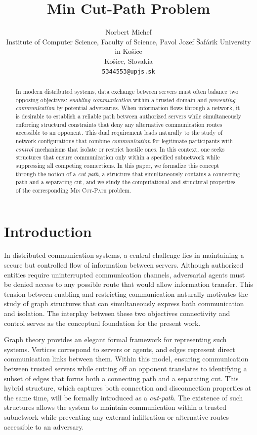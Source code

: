\documentclass[journal ]{new-aiaa}
\title{Min Cut-Path Problem}
\author{Norbert Micheľ\\
Institute of Computer Science, Faculty of Science, Pavol Jozef Šafárik University in Košice\\
Košice, Slovakia\\
\texttt{5344553@upjs.sk}}
\numberwithin{equation}{section}
\theoremstyle{definition}
\theoremstyle{plain}
\theoremstyle{remark}
\begin{document}
\maketitle

\begin{abstract}

In modern distributed systems, data exchange between servers must often balance two opposing objectives: 
\emph{enabling communication} within a trusted domain and \emph{preventing communication} by potential adversaries. 
When information flows through a network, it is desirable to establish a reliable path between authorized servers 
while simultaneously enforcing structural constraints that deny any alternative communication routes accessible to an opponent. 
This dual requirement leads naturally to the study of network configurations that combine 
\emph{communication} for legitimate participants with \emph{control} mechanisms that isolate or restrict hostile ones. 
In this context, one seeks structures that ensure communication only within a specified subnetwork while suppressing all competing connections. 
In this paper, we formalize this concept through the notion of a \emph{cut-path}, 
a structure that simultaneously contains a connecting path and a separating cut, 
and we study the computational and structural properties of the corresponding \textsc{Min Cut-Path} problem.

\end{abstract}





\section{Introduction}

In distributed communication systems, a central challenge lies in maintaining a secure but controlled flow of information between servers. 
Although authorized entities require uninterrupted communication channels, adversarial agents must be denied access to any possible route that would allow information transfer. 
This tension between enabling and restricting communication naturally motivates the study of graph structures that can simultaneously express both communication and isolation.
The interplay between these two objectives connectivity and control serves as the conceptual foundation for the present work.

Graph theory provides an elegant formal framework for representing such systems. 
Vertices correspond to servers or agents, and edges represent direct communication links between them. 
Within this model, ensuring communication between trusted servers while cutting off an opponent translates to identifying a subset of edges that forms both a connecting path and a separating cut. 
This hybrid structure, which captures both connection and disconnection properties at the same time, will be formally introduced as a \emph{cut-path}. 
The existence of such structures allows the system to maintain communication within a trusted subnetwork while preventing any external infiltration or alternative routes accessible to an adversary.
\end{document}

